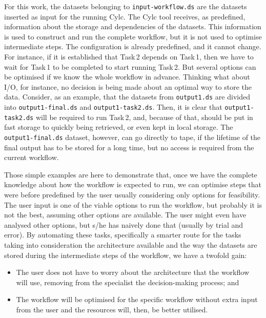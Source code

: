 \documentclass[a4paper]{article}
\begin{document}
For this work, the datasets belonging to \texttt{input-workflow.ds} are the datasets inserted as input for the running Cylc. The Cylc tool receives, as predefined, information about the storage and dependencies of the datasets. This information is used to construct and run the complete workflow, but it is not used to optimise intermediate steps.
The configuration is already predefined, and it cannot change. For instance, if it is established that Task\,2 depends on Task\,1, then we have to wait for Task\,1 to be completed to start running Task\,2.
But several options can be optimised if we know the whole workflow in advance. Thinking what about I/O, for instance, no decision is being made about an optimal way to store the data. Consider, as an example, that the datasets from \texttt{output1.ds} are divided into \texttt{output1-final.ds} and \texttt{output1-task2.ds}. Then, it is clear that \texttt{output1-task2.ds} will be required to run Task\,2, and, because of that, should be put in fast storage to quickly being retrieved, or even kept in local storage. The \texttt{output1-final.ds} dataset, however, can go directly to tape, if the lifetime of the final output has to be stored for a long time, but no access is required from the current workflow.

Those simple examples are here to demonstrate that, once we have the complete knowledge about how the workflow is expected to run, we can optimise steps that were before predefined by the user usually considering only options for feasibility. The user input is one of the viable options to run the workflow, but probably it is not the best, assuming other options are available. The user might even have analysed other options, but s/he has naively done that (usually by trial and error). By automating these tasks, specifically a smarter route for the tasks taking into consideration the architecture available and the way the datasets are stored during the intermediate steps of the workflow, we have a twofold gain:

\begin{itemize}

\item The user does not have to worry about the architecture that the workflow will use, removing from the specialist the decision-making process; and

\item The workflow will be optimised for the specific workflow without extra input from the user and the resources will, then, be better utilised.

\end{itemize}
\end{document}
